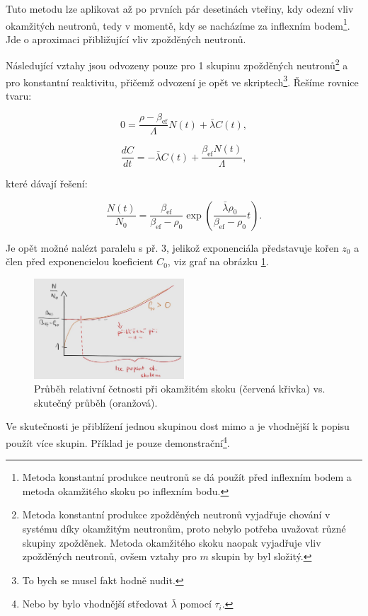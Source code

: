 Tuto metodu lze aplikovat až po prvních pár desetinách vteřiny, kdy odezní vliv okamžitých neutronů, tedy v momentě, kdy se nacházíme za inflexním bodem\footnote{Metoda konstantní produkce neutronů se dá použít před inflexním bodem a metoda okamžitého skoku po inflexním bodu.}. Jde o aproximaci přibližující vliv zpožděných neutronů.

Následující vztahy jsou odvozeny pouze pro 1 skupinu zpožděných neutronů\footnote{Metoda konstantní produkce zpožděných neutronů vyjadřuje chování v systému díky okamžitým neutronům, proto nebylo potřeba uvažovat různé skupiny zpožděnek. Metoda okamžitého skoku naopak vyjadřuje vliv zpožděných neutronů, ovšem vztahy pro $m$ skupin by byl složitý.} a pro konstantní reaktivitu, přičemž odvození je opět ve skriptech\footnote{To bych se musel fakt hodně nudit.}. Řešíme rovnice tvaru:

$$ 0 = \dfrac{\rho - \beta_{\text{ef}}}{\Lambda} N(t) + \bar{\lambda} C(t), $$

$$ \dfrac{dC}{dt} = -\bar{\lambda} C(t) + \dfrac{\beta_{\text{ef}}  N(t)}{\Lambda}, $$

které dávají řešení:

$$ \dfrac{N(t)}{N_0} = \dfrac{\beta_{\text{ef}}}{\beta_{\text{ef}} - \rho_0} \exp{\left ( \dfrac{\bar{\lambda} \rho_0}{\beta_{\text{ef}} - \rho_0} t \right )}. $$

Je opět možné nalézt paralelu s př. 3, jelikož exponenciála představuje kořen $z_0$ a člen před exponencielou koeficient $C_0$, viz graf na obrázku \ref{fig_okamzity_skok}.

\begin{figure}[H]
  \centering
  \includegraphics[width=0.5\textwidth]{img/okamzity_skok.jpg}
  \caption{Průběh relativní četnosti při okamžitém skoku (červená křivka) vs. skutečný průběh (oranžová).}
  \label{fig_okamzity_skok}
\end{figure}

Ve skutečnosti je přiblížení jednou skupinou dost mimo a je vhodnější k popisu použít více skupin. Příklad je pouze demonstrační\footnote{Nebo by bylo vhodnější středovat $\bar{\lambda}$ pomocí $\tau_i$.}.

